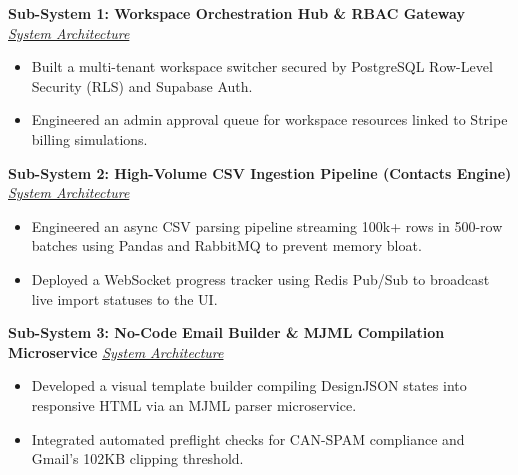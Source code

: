 \documentclass[10pt,a4paper]{article}
\begin{document}
\vspace{3pt}

\noindent\textbf{Sub-System 1: Workspace Orchestration Hub \& RBAC Gateway} \hfill \href{https://github.com/Rahul-pamula/ShrFlow-V1/blob/main/docs/projects/1_multi_tenant_saas.md}{\small\textit{System Architecture}}
\begin{itemize}[leftmargin=1.2em, topsep=1pt, itemsep=1pt, parsep=0pt, partopsep=0pt]
    \item Built a multi-tenant workspace switcher secured by PostgreSQL Row-Level Security (RLS) and Supabase Auth.
    \item Engineered an admin approval queue for workspace resources linked to Stripe billing simulations.
\end{itemize}

\vspace{3pt}

\noindent\textbf{Sub-System 2: High-Volume CSV Ingestion Pipeline (Contacts Engine)} \hfill \href{https://github.com/Rahul-pamula/ShrFlow-V1/blob/main/docs/projects/2_csv_ingestion.md}{\small\textit{System Architecture}}
\begin{itemize}[leftmargin=1.2em, topsep=1pt, itemsep=1pt, parsep=0pt, partopsep=0pt]
    \item Engineered an async CSV parsing pipeline streaming 100k+ rows in 500-row batches using Pandas and RabbitMQ to prevent memory bloat.
    \item Deployed a WebSocket progress tracker using Redis Pub/Sub to broadcast live import statuses to the UI.
\end{itemize}

\vspace{3pt}

\noindent\textbf{Sub-System 3: No-Code Email Builder \& MJML Compilation Microservice} \hfill \href{https://github.com/Rahul-pamula/ShrFlow-V1/blob/main/docs/projects/3_email_builder.md}{\small\textit{System Architecture}}
\begin{itemize}[leftmargin=1.2em, topsep=1pt, itemsep=1pt, parsep=0pt, partopsep=0pt]
    \item Developed a visual template builder compiling DesignJSON states into responsive HTML via an MJML parser microservice.
    \item Integrated automated preflight checks for CAN-SPAM compliance and Gmail's 102KB clipping threshold.
\end{itemize}

\vspace{3pt}
\end{document}
